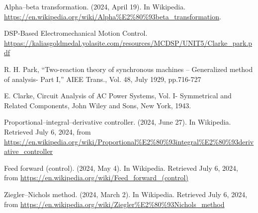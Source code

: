 Alpha–beta transformation. (2024, April 19). In Wikipedia. \url{https://en.wikipedia.org/wiki/Alpha%E2%80%93beta_transformation}.

DSP-Based Electromechanical Motion Control. \url{httpas://kaliasgoldmedal.yolasite.com/resources/MCDSP/UNIT5/Clarke_park.pdf}

R. H. Park, “Two-reaction theory of synchronous machines – Generalized method of analysis- Part I,” AIEE Trans., Vol. 48, July 1929, pp.716-727

E. Clarke, Circuit Analysis of AC Power Systems, Vol. I- Symmetrical and Related Components, John Wiley and Sons, New York, 1943.

Proportional–integral–derivative controller. (2024, June 27). In Wikipedia. Retrieved July 6, 2024, from \url{https://en.wikipedia.org/wiki/Proportional%E2%80%93integral%E2%80%93derivative_controller}

Feed forward (control). (2024, May 4). In Wikipedia. Retrieved July 6, 2024, from \url{https://en.wikipedia.org/wiki/Feed_forward_(control)}

Ziegler–Nichols method. (2024, March 2). In Wikipedia. Retrieved July 6, 2024, from \url{https://en.wikipedia.org/wiki/Ziegler%E2%80%93Nichols_method}
